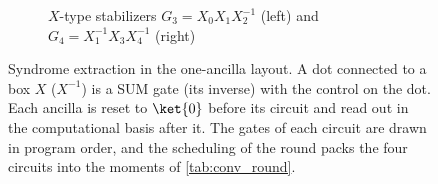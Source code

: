 \begin{figure}[tb]
    \vspace{0.3cm}
    \begin{subfigure}[b]{\textwidth}
        \centering
        \hspace{1.2cm}
        \caption{$X$-type stabilizers $G_3 = X_0X_1X_2^{-1}$ (left) and $G_4 = X_1^{-1}X_3X_4^{-1}$ (right)}
        \label{fig:lrb_d}
    \end{subfigure}

    \caption{Syndrome extraction in the one-ancilla layout. A dot connected to a box $X$ ($X^{-1}$) is a SUM gate (its inverse) with the control on the dot. Each ancilla is reset to $\ket{0}$ before its circuit and read out in the computational basis after it. The gates of each circuit are drawn in program order, and the scheduling of the round packs the four circuits into the moments of \autoref{tab:conv_round}.}
    \label{fig:rounds_one_ancilla}
\end{figure}

